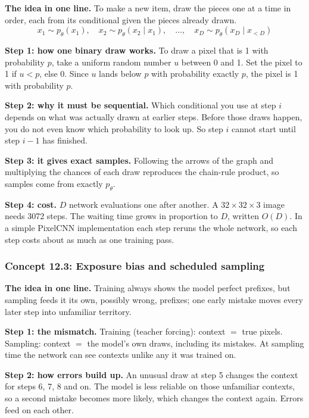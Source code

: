 \documentclass[12pt,a4paper]{article}
\begin{document}
\textbf{The idea in one line.} To make a new item, draw the pieces one at a time in order, each from its conditional given the pieces already drawn.
\[
x_1\sim p_\theta(x_1),\quad x_2\sim p_\theta(x_2\mid x_1),\quad\dots,\quad x_D\sim p_\theta(x_D\mid x_{<D})
\]

\textbf{Step 1: how one binary draw works.} To draw a pixel that is 1 with probability $p$, take a uniform random number $u$ between 0 and 1. Set the pixel to 1 if $u<p$, else 0. Since $u$ lands below $p$ with probability exactly $p$, the pixel is 1 with probability $p$.

\textbf{Step 2: why it must be sequential.} Which conditional you use at step $i$ depends on what was actually drawn at earlier steps. Before those draws happen, you do not even know which probability to look up. So step $i$ cannot start until step $i-1$ has finished.

\textbf{Step 3: it gives exact samples.} Following the arrows of the graph and multiplying the chances of each draw reproduces the chain-rule product, so samples come from exactly $p_\theta$.

\textbf{Step 4: cost.} $D$ network evaluations one after another. A $32\times32\times3$ image needs 3072 steps. The waiting time grows in proportion to $D$, written $O(D)$. In a simple PixelCNN implementation each step reruns the whole network, so each step costs about as much as one training pass.

\subsubsection{Concept 12.3: Exposure bias and scheduled sampling}\label{c12-3}

\textbf{The idea in one line.} Training always shows the model perfect prefixes, but sampling feeds it its own, possibly wrong, prefixes; one early mistake moves every later step into unfamiliar territory.

\textbf{Step 1: the mismatch.} Training (teacher forcing): context $=$ true pixels. Sampling: context $=$ the model's own draws, including its mistakes. At sampling time the network can see contexts unlike any it was trained on.

\textbf{Step 2: how errors build up.} An unusual draw at step 5 changes the context for steps 6, 7, 8 and on. The model is less reliable on those unfamiliar contexts, so a second mistake becomes more likely, which changes the context again. Errors feed on each other.
\end{document}
